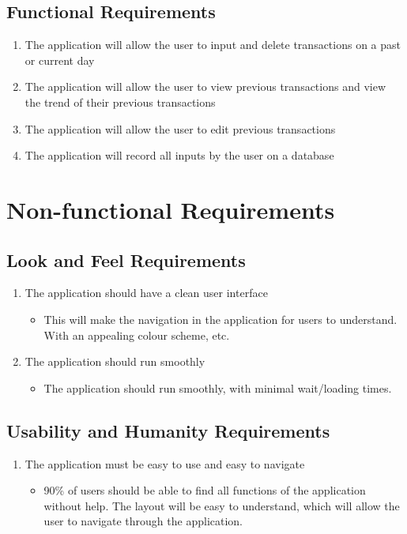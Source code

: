 \documentclass[12pt, titlepage]{article}
\begin{document}
\subsection{Functional Requirements}
   \begin{enumerate}
     \item The application will allow the user to input and delete transactions on a past or current day
     \item The application will allow the user to view previous transactions and view the trend of their previous transactions
     \item  The application will allow the user to edit previous transactions
     \item The application will record all inputs by the user on a database
   \end{enumerate}

\section{Non-functional Requirements}

\subsection{Look and Feel Requirements}
   \begin{enumerate}
   \item The application should have a clean user interface
   \begin{itemize}
     \item This will make the navigation in the application for users to understand. With an appealing colour scheme, etc.
   \end{itemize}

   \item The application should run smoothly
   \begin{itemize}
     \item The application should run smoothly, with minimal wait/loading times. 
   \end{itemize}
\end{enumerate}
\subsection{Usability and Humanity Requirements}
   \begin{enumerate}
   \item The application must be easy to use and easy to navigate
   \begin{itemize}
     \item 90\% of users should be able to find all functions of the application without help. The layout will be easy to understand, which will allow the user to navigate through the application.
   \end{itemize}
 \end{enumerate}
\end{document}
